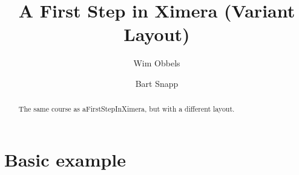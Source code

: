 \documentclass{xourse}
\author{Wim Obbels \and Bart Snapp}
\title{A First Step in Ximera (Variant Layout)}
\begin{document}
\begin{abstract}
    The same course as aFirstStepInXimera, but with a different layout.
\end{abstract}
\maketitle
\part{Basic example}

    \chapterstyle
    \sectionstyle

    \chapterstyle
\end{document}
